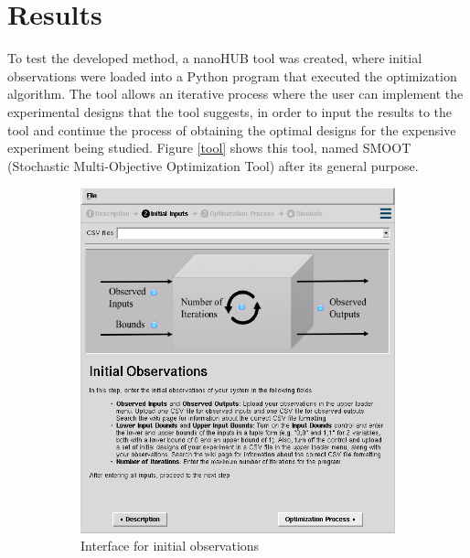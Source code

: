 \documentclass{article}
\begin{document}
\section{Results}

To test the developed method, a nanoHUB tool was created, where initial observations were loaded into a Python program that executed the optimization algorithm. The tool allows an iterative process where the user can implement the experimental designs that the tool suggests, in order to input the results to the tool and continue the process of obtaining the optimal designs for the expensive experiment being studied. Figure \ref{tool} shows this tool, named SMOOT (Stochastic Multi-Objective Optimization Tool) after its general purpose.\\

\begin{figure}
\centering
    \begin{subfigure}{0.45\textwidth}
        \includegraphics[width=\textwidth]{tool1}
        \caption{Interface for initial observations}
        \label{tool_1}
    \end{subfigure}
    \hfill
    \begin{subfigure}{0.45\textwidth}

\end{subfigure}
\end{figure}
\end{document}
